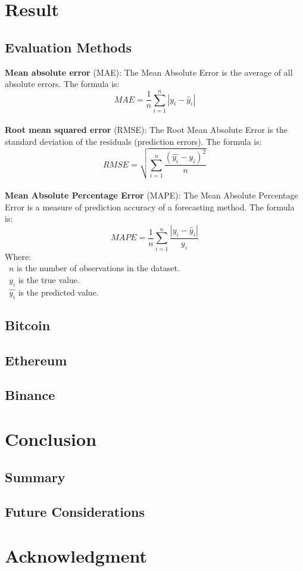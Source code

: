 \documentclass{ieeeojies}
\begin{document}
\section{Result}

\subsection{Evaluation Methods}
\textbf{Mean absolute error} (MAE): 
The Mean Absolute Error is the average of all absolute errors. The formula is:\\
\[MAE = \frac{1}{n} \sum_{i=1}^{n} | y_i - \hat{y}_i |\]\\
  
\textbf{Root mean squared error} (RMSE): The Root Mean Absolute Error is the standard deviation of the residuals (prediction errors). The formula is: \\
\[RMSE=\sqrt{\sum_{i=1}^{n} \frac{(\hat{y_i}-y_i )^2}{n} }\]\\
\textbf{Mean Absolute Percentage Error} (MAPE): The Mean Absolute Percentage Error is a measure of prediction accuracy of a forecasting method. The formula is:  \\
\[MAPE=\frac{1}{n}\sum_{i=1}^{n} \frac{|y_i-\hat{y}_i|}{y_i}\]
Where: \\
	\indent\textbullet\ \(n\) is the number of observations in the dataset.\\
	\indent\textbullet\ \(y_i\)  is the true value.\\
	\indent\textbullet\ \(\hat{y_i}\) is the predicted value.
 \subsection{Bitcoin}
\subsection{Ethereum}
\subsection{Binance}
\section{Conclusion}
\subsection{Summary}

\subsection{Future Considerations}

\section*{Acknowledgment}
\nocite{*}


\EOD
\end{document}
